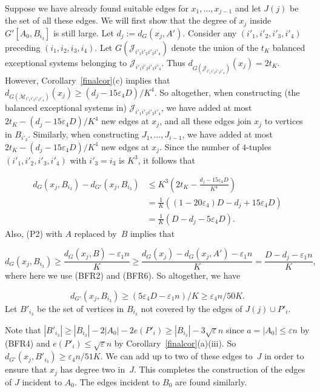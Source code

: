 \documentclass{memo-l}
\def\COMMENT#1{}
\def\eps{\varepsilon}
\numberwithin{section}{chapter}
\numberwithin{equation}{section}
\numberwithin{firstthm}{section}
\numberwithin{figure}{section}
\begin{document}
{Suppose we have already found suitable edges for $x_1,\dots,x_{j-1}$ and let $J(j)$ be the set of all these edges.
We will first show that the degree of $x_j$ inside $G'[A_0,B_{i_3}]$ is still large.
Let $d_j:=d_G(x_j,A')$. Consider any $(i'_1,i'_2,i'_3,i'_4)$ preceding $(i_1,i_2,i_3,i_4)$.
Let $G({\mathcal J}_{i'_1i'_2i'_3i'_4})$ denote the union of the $t_K$ balanced exceptional systems belonging to ${\mathcal J}_{i'_1i'_2i'_3i'_4}$.
Thus $d_{G({\mathcal J}_{i'_1i'_2i'_3i'_4})}(x_j)=2t_K$. However, Corollary~\ref{finalcor}(c) implies that
$d_{G({\mathcal M}_{i'_1i'_2i'_3i'_4})}(x_j)\ge (d_j-15\eps_4 D)/K^4$. So altogether, when constructing (the balanced exceptional systems in)
${\mathcal J}_{i'_1i'_2i'_3i'_4}$, we have added at most $2t_K-(d_j-15\eps_4 D)/K^4$ new edges
at $x_j$, and all these edges join $x_j$ to vertices in $B_{i'_3}$. Similarly, when constructing
$J_1,\dots,J_{i-1}$, we have added at most $2t_K-(d_j-15\eps_4 D)/K^4$ new edges at $x_j$.
Since the number of $4$-tuples $(i'_1,i'_2,i'_3,i'_4)$ with $i'_3=i_3$ is $K^3$, it follows that%
   \COMMENT{Daniela: previously had $\le $ instead of the first $=$}
\begin{align*}
d_G(x_j,B_{i_3})-d_{G'}(x_j,B_{i_3})  
& \le K^3 \left(2t_K - \frac{d_j-15\eps_4 D}{K^4}\right) \\
& = \frac{1}{K} \left( (1-20\eps_4)D -d_j+15\eps_4D \right) \\
& = \frac{1}{K} \left( D-d_j -5 \eps_4D \right). 
\end{align*}
Also, (P2) with $A$ replaced by~$B$ implies that%
  \COMMENT{AL:changed $d_G(x_j,B_{i_3})=\frac{d_G(x_j,B)\pm \eps_1 n}{K}$ to $d_G(x_j,B_{i_3})\ge\frac{d_G(x_j,B)- \eps_1 n}{K}$}
$$d_G(x_j,B_{i_3}) \ge \frac{d_G(x_j,B) -  \eps_1 n}{K}\ge \frac{d_G(x_j)-d_G(x_j,A')-\eps_1 n}{K} = \frac{D-d_j -\eps_1 n}{K},
$$
where here we use (BFR2) and (BFR6).
So altogether, we have%
\COMMENT{AL: changed $\eps_4 n/25K$ with $\eps_4 n/50K$}
$$
d_{G'}(x_j,B_{i_3})  \ge (5\eps_4 D- \eps_1n)/K\ge \eps_4 n/50K.
$$
Let $B'_{i_3}$ be the set of vertices in $B_{i_3}$ not covered by the edges of $J(j)\cup P'_i$.%
\COMMENT{AL: added edges of}
Note that $|B'_{i_3}| \ge |B_{i_3}|- 2|A_0|-2e(P'_i)\ge |B_{i_3}|-3\sqrt{\eps}n$ since 
$a=|A_0|\le \eps n$ by (BFR4)
and $e(P'_i)\le \sqrt{\eps}n$ by Corollary~\ref{finalcor}(a)(iii).
So $d_{G'}(x_j,B'_{i_3}) \ge \eps_4 n/51K$. We can add up to two of these edges to~$J$ in order to ensure that $x_j$ has degree two in~$J$.
This completes the construction of the edges of $J$ incident to $A_0$. The edges incident to $B_0$ are found similarly.

}
\end{document}
